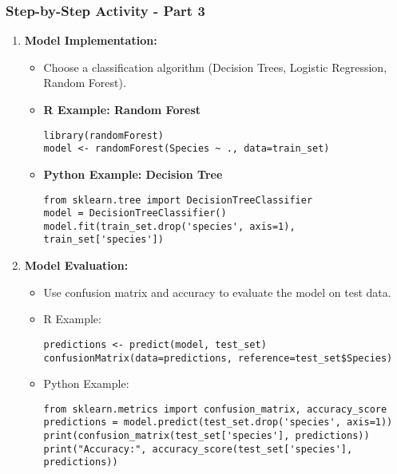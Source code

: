 \documentclass[aspectratio=169]{beamer}
\begin{document}
\begin{frame}[fragile]
    \frametitle{Step-by-Step Activity - Part 3}
    \begin{enumerate}[resume]
        \item \textbf{Model Implementation:}
        \begin{itemize}
            \item Choose a classification algorithm (Decision Trees, Logistic Regression, Random Forest).

            \item \textbf{R Example: Random Forest}
            \begin{lstlisting}
library(randomForest)
model <- randomForest(Species ~ ., data=train_set)
            \end{lstlisting}

            \item \textbf{Python Example: Decision Tree}
            \begin{lstlisting}
from sklearn.tree import DecisionTreeClassifier
model = DecisionTreeClassifier()
model.fit(train_set.drop('species', axis=1), train_set['species'])
            \end{lstlisting}
        \end{itemize}

        \item \textbf{Model Evaluation:}
        \begin{itemize}
            \item Use confusion matrix and accuracy to evaluate the model on test data.
            \item R Example: 
            \begin{lstlisting}
predictions <- predict(model, test_set)
confusionMatrix(data=predictions, reference=test_set$Species)
            \end{lstlisting}
            \item Python Example:
            \begin{lstlisting}
from sklearn.metrics import confusion_matrix, accuracy_score
predictions = model.predict(test_set.drop('species', axis=1))
print(confusion_matrix(test_set['species'], predictions))
print("Accuracy:", accuracy_score(test_set['species'], predictions))
            \end{lstlisting}
        \end{itemize}
    \end{enumerate}
\end{frame}
\end{document}
